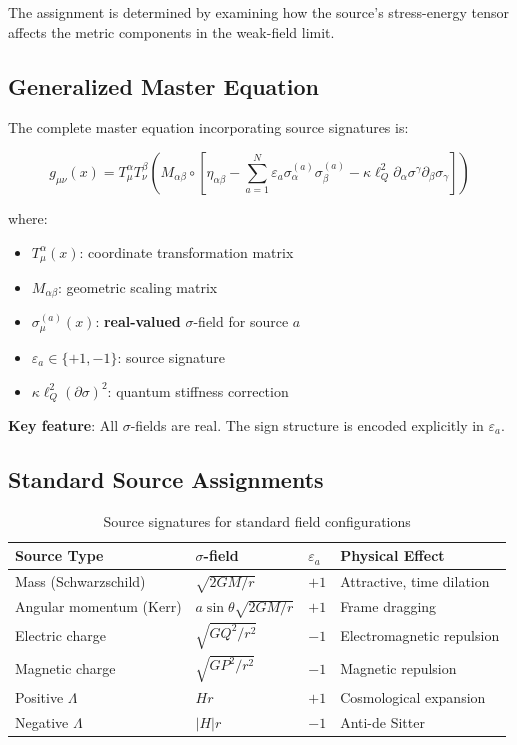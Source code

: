 \documentclass[11pt,a4paper]{article}
\theoremstyle{definition}
\theoremstyle{remark}
\begin{document}
	The assignment is determined by examining how the source's stress-energy tensor affects the metric components in the weak-field limit.
	
	\subsection{Generalized Master Equation}
	
	The complete master equation incorporating source signatures is:
	
	\begin{equation}
		\boxed{g_{\mu\nu}(x) = T^\alpha_\mu T^\beta_\nu \left(M_{\alpha\beta} \circ \left[\eta_{\alpha\beta} - \sum_{a=1}^N \varepsilon_a \sigma_\alpha^{(a)}\sigma_\beta^{(a)} - \kappa\ell_Q^2 \partial_\alpha\sigma^\gamma \partial_\beta\sigma_\gamma\right]\right)}
		\label{eq:master_signature}
	\end{equation}
	
	where:
	\begin{itemize}
		\item $T^\alpha_\mu(x)$: coordinate transformation matrix
		\item $M_{\alpha\beta}$: geometric scaling matrix
		\item $\sigma_\mu^{(a)}(x)$: \textbf{real-valued} $\sigma$-field for source $a$
		\item $\varepsilon_a \in \{+1,-1\}$: source signature
		\item $\kappa\ell_Q^2(\partial\sigma)^2$: quantum stiffness correction
	\end{itemize}
	
	\textbf{Key feature}: All $\sigma$-fields are real. The sign structure is encoded explicitly in $\varepsilon_a$.
	
	\subsection{Standard Source Assignments}
	
	\begin{table}[h]
		\centering
		\caption{Source signatures for standard field configurations}
		\label{tab:source_signatures}
		\begin{tabular}{@{}llll@{}}
			\toprule
			\textbf{Source Type} & \textbf{$\sigma$-field} & \textbf{$\varepsilon_a$} & \textbf{Physical Effect} \\
			\midrule
			Mass (Schwarzschild) & $\sqrt{2GM/r}$ & $+1$ & Attractive, time dilation \\
			Angular momentum (Kerr) & $a\sin\theta\sqrt{2GM/r}$ & $+1$ & Frame dragging \\
			Electric charge & $\sqrt{GQ^2/r^2}$ & $-1$ & Electromagnetic repulsion \\
			Magnetic charge & $\sqrt{GP^2/r^2}$ & $-1$ & Magnetic repulsion \\
			Positive $\Lambda$ & $Hr$ & $+1$ & Cosmological expansion \\
			Negative $\Lambda$ & $|H|r$ & $-1$ & Anti-de Sitter \\
			\bottomrule
		\end{tabular}
	\end{table}
	
\end{document}
